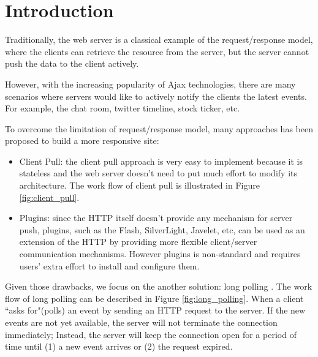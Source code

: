\section {Introduction}
Traditionally, the web server is a classical example of the request/response 
model, where the clients can retrieve the resource from the server, but the 
server cannot push the data to the client actively. 

However, with the increasing popularity of Ajax\cite{Ajax} technologies, there 
are many scenarios where servers would like to actively notify the clients the 
latest events. For example, the chat room, twitter timeline, stock ticker, etc.

To overcome the limitation of request/response model, many approaches has been 
proposed to build a more responsive site:

\begin{itemize}
\item Client Pull: the client pull approach is very easy to implement because 
it is stateless and the web server doesn't need to put much effort to modify 
its architecture. The work flow of client pull is illustrated in Figure
\ref{fig:client_pull}.

\item Plugins: since the HTTP itself doesn't provide any mechanism for server 
push, plugins, such as the Flash, SilverLight, Javelet, etc, can be used as an 
extension of the HTTP by providing more flexible client/server communication 
mechanisms. However plugins is non-standard and requires users' extra effort to 
install and configure them.
\end{itemize}

Given those drawbacks, we focus on the another solution: long polling
\cite{LongPolling}. The work flow of long polling can be described in Figure
\ref{fig:long_polling}. When a client ``asks for"(polls) an event by sending an
HTTP request to the server. If the new events are not yet available, the server 
will not terminate the connection immediately; Instead, the server will keep 
the connection open for a period of time until (1) a new event arrives or 
(2) the request expired.


